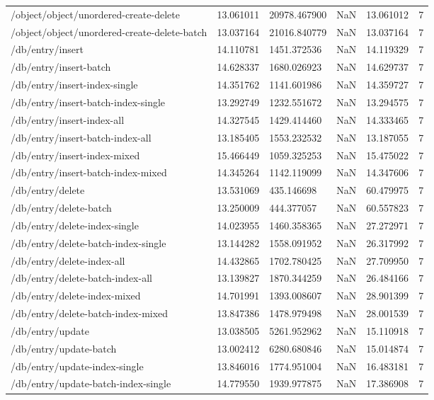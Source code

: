 \begin{tabularx}{\linewidth}{XXXXXX}
/object/object/unordered-create-delete & 13.061011 & 20978.467900 & NaN & 13.061012 & 7 \\
/object/object/unordered-create-delete-batch & 13.037164 & 21016.840779 & NaN & 13.037164 & 7 \\
/db/entry/insert & 14.110781 & 1451.372536 & NaN & 14.119329 & 7 \\
/db/entry/insert-batch & 14.628337 & 1680.026923 & NaN & 14.629737 & 7 \\
/db/entry/insert-index-single & 14.351762 & 1141.601986 & NaN & 14.359727 & 7 \\
/db/entry/insert-batch-index-single & 13.292749 & 1232.551672 & NaN & 13.294575 & 7 \\
/db/entry/insert-index-all & 14.327545 & 1429.414460 & NaN & 14.333465 & 7 \\
/db/entry/insert-batch-index-all & 13.185405 & 1553.232532 & NaN & 13.187055 & 7 \\
/db/entry/insert-index-mixed & 15.466449 & 1059.325253 & NaN & 15.475022 & 7 \\
/db/entry/insert-batch-index-mixed & 14.345264 & 1142.119099 & NaN & 14.347606 & 7 \\
/db/entry/delete & 13.531069 & 435.146698 & NaN & 60.479975 & 7 \\
/db/entry/delete-batch & 13.250009 & 444.377057 & NaN & 60.557823 & 7 \\
/db/entry/delete-index-single & 14.023955 & 1460.358365 & NaN & 27.272971 & 7 \\
/db/entry/delete-batch-index-single & 13.144282 & 1558.091952 & NaN & 26.317992 & 7 \\
/db/entry/delete-index-all & 14.432865 & 1702.780425 & NaN & 27.709950 & 7 \\
/db/entry/delete-batch-index-all & 13.139827 & 1870.344259 & NaN & 26.484166 & 7 \\
/db/entry/delete-index-mixed & 14.701991 & 1393.008607 & NaN & 28.901399 & 7 \\
/db/entry/delete-batch-index-mixed & 13.847386 & 1478.979498 & NaN & 28.001539 & 7 \\
/db/entry/update & 13.038505 & 5261.952962 & NaN & 15.110918 & 7 \\
/db/entry/update-batch & 13.002412 & 6280.680846 & NaN & 15.014874 & 7 \\
/db/entry/update-index-single & 13.846016 & 1774.951004 & NaN & 16.483181 & 7 \\
/db/entry/update-batch-index-single & 14.779550 & 1939.977875 & NaN & 17.386908 & 7 \\

\end{tabularx}
